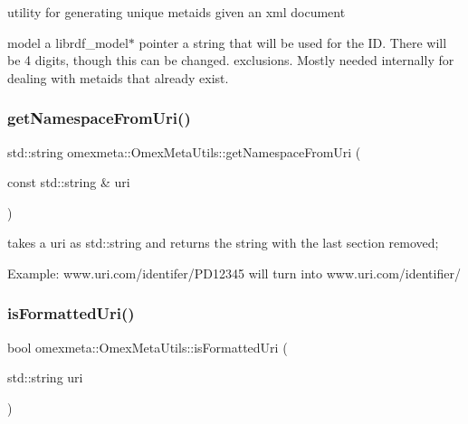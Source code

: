 utility for generating unique metaids given an xml document 

model a librdf\+\_\+model$\ast$ pointer a string that will be used for the ID. There will be 4 digits, though this can be changed. exclusions. Mostly needed internally for dealing with metaids that already exist. \mbox{\label{classomexmeta_1_1OmexMetaUtils_a0956bde073b212596d8e4b2ffc983e47}} 
\subsubsection{\texorpdfstring{get\+Namespace\+From\+Uri()}{getNamespaceFromUri()}}
{\footnotesize\ttfamily std\+::string omexmeta\+::\+Omex\+Meta\+Utils\+::get\+Namespace\+From\+Uri (\begin{DoxyParamCaption}\item[{const std\+::string \&}]{uri }\end{DoxyParamCaption})\hspace{0.3cm}{\ttfamily [static]}}



takes a uri as std\+::string and returns the string with the last section removed; 

Example\+: www.\+uri.\+com/identifer/\+P\+D12345 will turn into www.\+uri.\+com/identifier/ \mbox{\label{classomexmeta_1_1OmexMetaUtils_af663724f2efb0324a64c6a57e8491c13}} 
\subsubsection{\texorpdfstring{is\+Formatted\+Uri()}{isFormattedUri()}}
{\footnotesize\ttfamily bool omexmeta\+::\+Omex\+Meta\+Utils\+::is\+Formatted\+Uri (\begin{DoxyParamCaption}\item[{std\+::string}]{uri }\end{DoxyParamCaption})\hspace{0.3cm}{\ttfamily [static]}}




